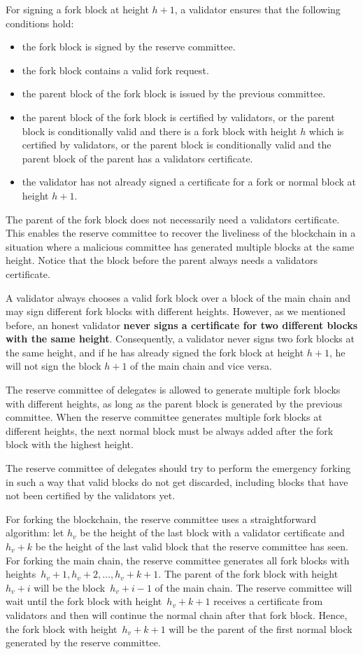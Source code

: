 For signing a fork block at height $h+1$, a validator ensures that the following conditions hold:
\begin{itemize}
    \item the fork block is signed by the reserve committee.
    \item the fork block contains a valid fork request.
    \item the parent block of the fork block is issued by the previous committee.
    \item the parent block of the fork block is certified by validators, or the parent block is conditionally
    valid and there is a fork block with height $h$ which is certified by validators, or the parent block is
    conditionally valid and the parent block of the parent has a validators certificate.
    \item the validator has not already signed a certificate for a fork or normal block at height $h+1$.
\end{itemize}

The parent of the fork block does not necessarily need a validators certificate. This enables the
reserve committee to recover the liveliness of the blockchain in a situation where a malicious committee has
generated multiple blocks at the same height. Notice that the block before the parent always needs a validators
certificate.

A validator always chooses a valid fork block over a block of the main chain and may sign different fork
blocks with different heights. However, as we mentioned before, an honest validator
\textbf{never signs a certificate for two different blocks with the same height}. Consequently, a validator never
signs two fork blocks at the same height, and if he has already signed the fork block at height $h+1$, he will not
sign the block $h+1$ of the main chain and vice versa.

The reserve committee of delegates is allowed to generate multiple fork blocks with different heights, as long as the
parent block is generated by the previous committee. When the reserve committee generates multiple fork blocks
at different heights, the next normal block must be always added after the fork block with the highest height.

The reserve committee of delegates should try to perform the emergency forking in such a way that
valid blocks do not get discarded, including blocks that have not been certified by the validators yet.

For forking the blockchain, the reserve committee uses a straightforward algorithm: let $h_v$ be the height of the last
block with a validator certificate and $h_v+k$ be the height of the last valid block that the reserve committee has
seen. For forking the main chain, the reserve committee generates all fork blocks with heights~$h_v+1,h_v+2,\dots,
h_v+k+1$. The parent of the fork block with height $h_v+i$ will be the block~$h_v+i-1$ of the main chain. The
reserve committee will wait until the fork block with height~$h_v+k+1$ receives a certificate from validators and
then will continue the normal chain after that fork block. Hence, the fork block with height~$h_v+k+1$
will be the parent of the first normal block generated by the reserve committee.

